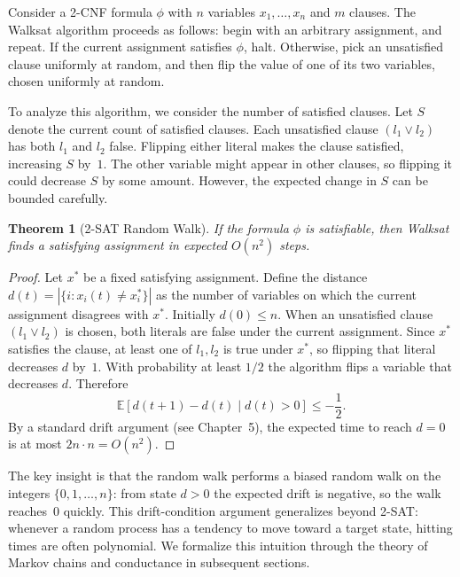 \documentclass[twoside,12pt]{book}
\theoremstyle{plain}
\newtheorem{theorem}{Theorem}[chapter]
\theoremstyle{definition}
\theoremstyle{remark}
\newenvironment{cpplisting}{\begin{center}\small}{\end{center}}
\begin{document}
Consider a 2-CNF formula $\phi$ with $n$ variables $x_1, \ldots, x_n$
and $m$ clauses. The Walksat algorithm proceeds as follows: begin with an
arbitrary assignment, and repeat. If the current assignment satisfies
$\phi$, halt. Otherwise, pick an unsatisfied clause uniformly at random,
and then flip the value of one of its two variables, chosen uniformly at
random.

To analyze this algorithm, we consider the number of satisfied clauses.
Let $S$ denote the current count of satisfied clauses. Each unsatisfied
clause $(l_1 \vee l_2)$ has both $l_1$ and $l_2$ false. Flipping either
literal makes the clause satisfied, increasing $S$ by~$1$. The other
variable might appear in other clauses, so flipping it could decrease $S$
by some amount. However, the expected change in $S$ can be bounded
carefully.

\begin{theorem}[2-SAT Random Walk]\label{thm:2sat-walk}
If the formula $\phi$ is satisfiable, then Walksat finds a satisfying
assignment in expected $O(n^2)$ steps.
\end{theorem}

\begin{proof}
Let $x^*$ be a fixed satisfying assignment. Define the distance
$d(t) = |\{i : x_i(t) \neq x_i^*\}|$ as the number of variables on which
the current assignment disagrees with $x^*$. Initially $d(0) \leq n$.
When an unsatisfied clause $(l_1 \vee l_2)$ is chosen, both literals are
false under the current assignment. Since $x^*$ satisfies the clause, at
least one of $l_1, l_2$ is true under $x^*$, so flipping that literal
decreases $d$ by~$1$. With probability at least $1/2$ the algorithm flips
a variable that decreases $d$. Therefore
\[
    \mathbb{E}[d(t+1) - d(t) \mid d(t) > 0] \leq -\frac{1}{2}.
\]
By a standard drift argument (see Chapter~5), the expected time to reach
$d = 0$ is at most $2n \cdot n = O(n^2)$.
\end{proof}

\begin{cpplisting}

\end{cpplisting}

The key insight is that the random walk performs a biased random walk on
the integers $\{0, 1, \ldots, n\}$: from state $d > 0$ the expected drift
is negative, so the walk reaches~$0$ quickly. This
drift-condition argument generalizes beyond 2-SAT: whenever a random
process has a tendency to move toward a target state, hitting times are
often polynomial. We formalize this intuition through the theory of
Markov chains and conductance in subsequent sections.
\end{document}
